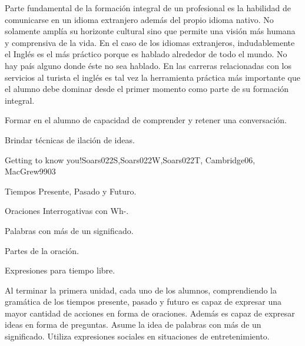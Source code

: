 \begin{syllabus}


\begin{justification}
Parte fundamental de la formación integral de un profesional es la habilidad de 
comunicarse en un idioma extranjero además del propio idioma nativo. No solamente 
amplía su horizonte cultural sino que permite una visión más humana y comprensiva 
de la vida. En el caso de los idiomas extranjeros, indudablemente el Inglés es el 
más práctico porque es hablado alrededor de todo el mundo. No hay país alguno donde 
éste no sea hablado. En las carreras relacionadas con los servicios al turista el 
inglés es tal vez la herramienta práctica más importante que el alumno debe dominar 
desde el primer momento como parte de su formación integral.
\end{justification}

\begin{goals}
\item Formar en el alumno de capacidad de comprender y retener una conversación.
\item Brindar técnicas de ilación de ideas.
\end{goals}

\begin{outcomes}
\end{outcomes}

\begin{unit}{Getting to know you!}{Soars022S,Soars022W,Soars022T, Cambridge06, MacGrew99}{0}{3}
   \begin{topics}
      \item Tiempos Presente, Pasado y Futuro.
      \item Oraciones Interrogativas con Wh-.
      \item Palabras con más de un significado.
      \item Partes de la oración.
      \item Expresiones para tiempo libre.
   \end{topics}

   \begin{unitgoals}
      \item Al terminar la primera unidad, cada uno de los alumnos, comprendiendo la gramática de los tiempos presente, pasado y futuro es capaz de expresar una mayor cantidad de acciones en forma de oraciones.  Además es capaz de expresar ideas en forma de preguntas.  Asume la idea de palabras con más de un significado. Utiliza expresiones sociales en situaciones de entretenimiento. 
   \end{unitgoals}
\end{unit}


\end{syllabus}
